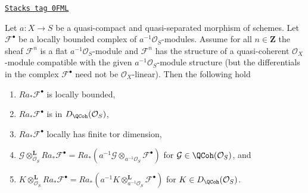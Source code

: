 \begin{lemma}
\label{perfect-lemma-cohomology-de-rham-base-change}
\href{https://stacks.math.columbia.edu/tag/0FML}{\texttt{Stacks tag 0FML}}

Let $a : X \to S$ be a quasi-compact and quasi-separated morphism
of schemes. Let $\mathcal{F}^\bullet$ be a locally bounded
complex of $a^{-1}\mathcal{O}_S$-modules. Assume for all $n \in \mathbf{Z}$
the sheaf $\mathcal{F}^n$ is a flat $a^{-1}\mathcal{O}_S$-module and
$\mathcal{F}^n$ has the structure of a quasi-coherent $\mathcal{O}_X$-module
compatible with the given $a^{-1}\mathcal{O}_S$-module structure (but the
differentials in the complex $\mathcal{F}^\bullet$ need not
be $\mathcal{O}_X$-linear). Then the following hold
\begin{enumerate}
\item $Ra_*\mathcal{F}^\bullet$ is locally bounded,
\item $Ra_*\mathcal{F}^\bullet$ is in $D_\QCoh(\mathcal{O}_S)$,
\item $Ra_*\mathcal{F}^\bullet$ locally has finite tor dimension,
\item $\mathcal{G} \otimes_{\mathcal{O}_S}^\mathbf{L} Ra_*\mathcal{F}^\bullet =
Ra_*(a^{-1}\mathcal{G} \otimes_{a^{-1}\mathcal{O}_S} \mathcal{F}^\bullet)$
for $\mathcal{G} \in \QCoh(\mathcal{O}_S)$, and
\item $K \otimes_{\mathcal{O}_S}^\mathbf{L} Ra_*\mathcal{F}^\bullet =
Ra_*(a^{-1}K \otimes_{a^{-1}\mathcal{O}_S}^\mathbf{L} \mathcal{F}^\bullet)$
for $K \in D_\QCoh(\mathcal{O}_S)$.
\end{enumerate}
\end{lemma}

